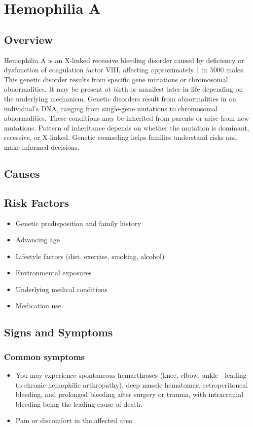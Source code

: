 \chapter{Hemophilia A}
\label{sec:Hemophilia A}

\section{Overview}
Hemophilia A is an X-linked recessive bleeding disorder caused by deficiency or dysfunction of coagulation factor VIII, affecting approximately 1 in 5000 males. This genetic disorder results from specific gene mutations or chromosomal abnormalities. It may be present at birth or manifest later in life depending on the underlying mechanism. Genetic disorders result from abnormalities in an individual's DNA, ranging from single-gene mutations to chromosomal abnormalities. These conditions may be inherited from parents or arise from new mutations. Pattern of inheritance depends on whether the mutation is dominant, recessive, or X-linked. Genetic counseling helps families understand risks and make informed decisions.
\section{Causes}
\section{Risk Factors}

\begin{itemize}[noitemsep]
  \item Genetic predisposition and family history
  \item Advancing age
  \item Lifestyle factors (diet, exercise, smoking, alcohol)
  \item Environmental exposures
  \item Underlying medical conditions
  \item Medication use
\end{itemize}
\section{Signs and Symptoms}

\subsection{Common symptoms}
\begin{itemize}[noitemsep]
  \item You may experience spontaneous hemarthroses (knee, elbow, ankle---leading to chronic hemophilic arthropathy), deep muscle hematomas, retroperitoneal bleeding, and prolonged bleeding after surgery or trauma, with intracranial bleeding being the leading cause of death.

  \item Pain or discomfort in the affected area
  \end{itemize}

